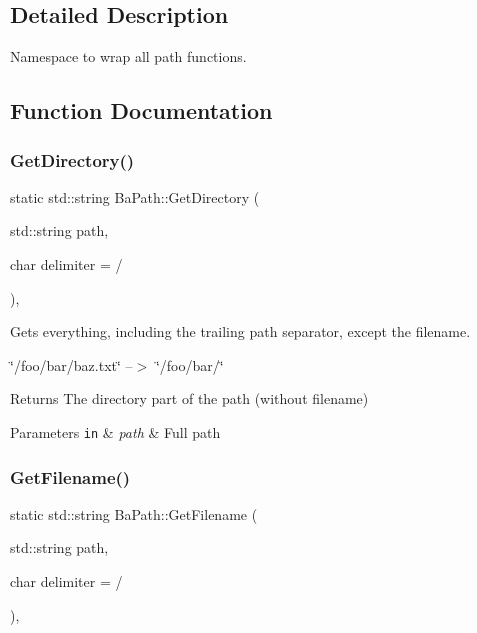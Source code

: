 \subsection{Detailed Description}
Namespace to wrap all path functions. 

\subsection{Function Documentation}
\mbox{\label{namespaceBaPath_a565903d233aae8655f38347e3bb0a551}} 
\subsubsection{\texorpdfstring{Get\+Directory()}{GetDirectory()}}
{\footnotesize\ttfamily static std\+::string Ba\+Path\+::\+Get\+Directory (\begin{DoxyParamCaption}\item[{std\+::string}]{path,  }\item[{char}]{delimiter = {\ttfamily \textquotesingle{}/\textquotesingle{}} }\end{DoxyParamCaption})\hspace{0.3cm}{\ttfamily [inline]}, {\ttfamily [static]}}



Gets everything, including the trailing path separator, except the filename. 


\begin{DoxyItemize}
\item \char`\"{}/foo/bar/baz.\+txt\char`\"{} --$>$ \char`\"{}/foo/bar/\char`\"{}
\end{DoxyItemize}

\begin{DoxyReturn}{Returns}
The directory part of the path (without filename) 
\end{DoxyReturn}

\begin{DoxyParams}[1]{Parameters}
\mbox{\tt in}  & {\em path} & Full path \\
\hline
\end{DoxyParams}
\mbox{\label{namespaceBaPath_a7285e10c066bb8fb44faf97b709ad8ed}} 
\subsubsection{\texorpdfstring{Get\+Filename()}{GetFilename()}}
{\footnotesize\ttfamily static std\+::string Ba\+Path\+::\+Get\+Filename (\begin{DoxyParamCaption}\item[{std\+::string}]{path,  }\item[{char}]{delimiter = {\ttfamily \textquotesingle{}/\textquotesingle{}} }\end{DoxyParamCaption})\hspace{0.3cm}{\ttfamily [inline]}, {\ttfamily [static]}}



